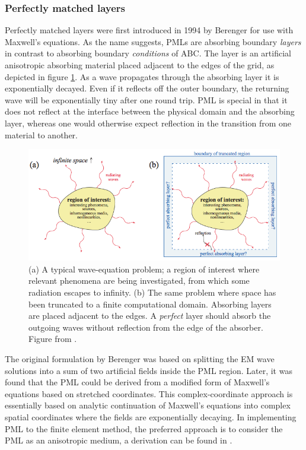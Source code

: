 \subsubsection*{Perfectly matched layers}
Perfectly matched layers were first introduced in 1994 by Berenger\cite{PML_Berenger} for use with Maxwell's equations. As the name suggests, PMLs are absorbing boundary \emph{layers} in contrast to absorbing boundary \emph{conditions} of ABC. The layer is an artificial anisotropic absorbing material placed adjacent to the edges of the grid, as depicted in figure \ref{fig:PML_region}. As a wave propagates through the absorbing layer it is exponentially decayed. Even if it reflects off the outer boundary, the returning wave will be exponentially tiny after one round trip. PML is special in that it does not reflect at the interface between the physical domain and the absorbing layer, whereas one would otherwise expect reflection in the transition from one material to another\cite{web:PML_MIT}.

\begin{figure}[htb]
    \centering
    \includegraphics[width=0.9\linewidth]{figures/Ch2/PML_region.png}
    \caption{(a) A typical wave-equation problem; a region of interest where relevant phenomena are being investigated, from which some radiation escapes to infinity. (b) The same problem where space has been truncated to a finite computational domain. Absorbing layers are placed adjacent to the edges. A \emph{perfect} layer should absorb the outgoing waves without reflection from the edge of the absorber. Figure from \cite{web:PML_MIT}.}
    \label{fig:PML_region}
\end{figure}

The original formulation by Berenger\cite{PML_Berenger} was based on splitting the EM wave solutions into a sum of two artificial fields inside the PML region. Later, it was found that the PML could be derived from a modified form of Maxwell's equations based on stretched coordinates\cite{PML_coordstretch}. This complex-coordinate approach is essentially based on analytic continuation of Maxwell's equations into complex spatial coordinates where the fields are exponentially decaying\cite{web:PML_MIT}. In implementing PML to the finite element method, the preferred approach is to consider the PML as an anisotropic medium, a derivation can be found in \cite{FEM_TheoryAndCompOfEM_Jian-Ming_Jin}.

